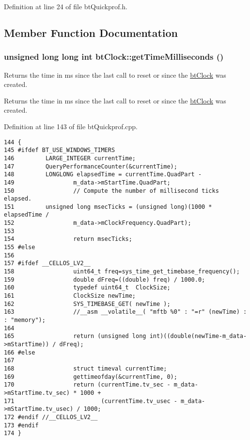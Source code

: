 Definition at line 24 of file btQuickprof.h.

\subsection{Member Function Documentation}
\hypertarget{classbt_clock_989e96af94f4ec3ae28635f5f843c066}{
\subsubsection[getTimeMilliseconds]{\setlength{\rightskip}{0pt plus 5cm}unsigned long long int btClock::getTimeMilliseconds ()}}
\label{classbt_clock_989e96af94f4ec3ae28635f5f843c066}


Returns the time in ms since the last call to reset or since the \hyperlink{classbt_clock}{btClock} was created.

Returns the time in ms since the last call to reset or since the \hyperlink{classbt_clock}{btClock} was created. 

Definition at line 143 of file btQuickprof.cpp.

\begin{Code}\begin{verbatim}144 {
145 #ifdef BT_USE_WINDOWS_TIMERS
146         LARGE_INTEGER currentTime;
147         QueryPerformanceCounter(&currentTime);
148         LONGLONG elapsedTime = currentTime.QuadPart -
149                 m_data->mStartTime.QuadPart;
150                 // Compute the number of millisecond ticks elapsed.
151         unsigned long msecTicks = (unsigned long)(1000 * elapsedTime /
152                 m_data->mClockFrequency.QuadPart);
153 
154                 return msecTicks;
155 #else
156 
157 #ifdef __CELLOS_LV2__
158                 uint64_t freq=sys_time_get_timebase_frequency();
159                 double dFreq=((double) freq) / 1000.0;
160                 typedef uint64_t  ClockSize;
161                 ClockSize newTime;
162                 SYS_TIMEBASE_GET( newTime );
163                 //__asm __volatile__( "mftb %0" : "=r" (newTime) : : "memory");
164 
165                 return (unsigned long int)((double(newTime-m_data->mStartTime)) / dFreq);
166 #else
167 
168                 struct timeval currentTime;
169                 gettimeofday(&currentTime, 0);
170                 return (currentTime.tv_sec - m_data->mStartTime.tv_sec) * 1000 +
171                         (currentTime.tv_usec - m_data->mStartTime.tv_usec) / 1000;
172 #endif //__CELLOS_LV2__
173 #endif
174 }
\end{verbatim}
\end{Code}


